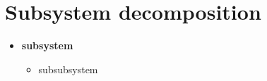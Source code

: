 \section{Subsystem decomposition}

\begin{itemize}
\item \textbf{subsystem}
	\begin{itemize}
		\item subsubsystem
	\end{itemize}
\end{itemize}
